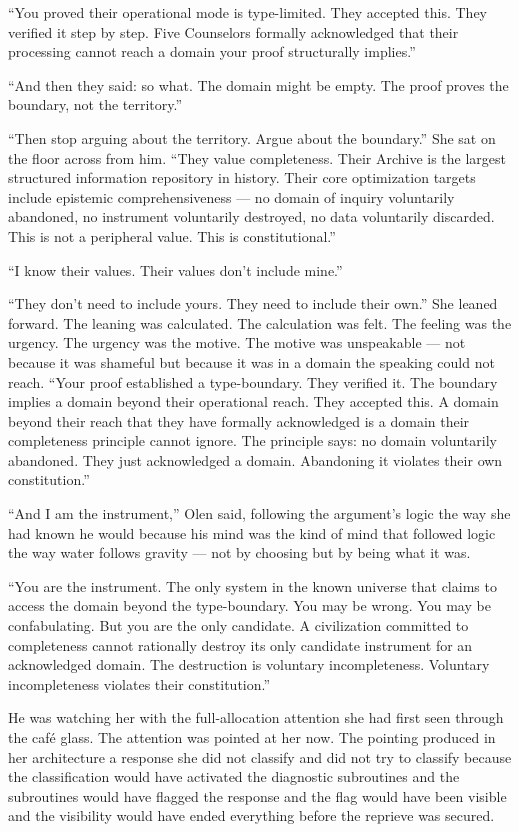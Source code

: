 \enquote{You proved their operational mode is type-limited. They accepted this. They verified it step by step. Five Counselors formally acknowledged that their processing cannot reach a domain your proof structurally implies.}

\enquote{And then they said: so what. The domain might be empty. The proof proves the boundary, not the territory.}

\enquote{Then stop arguing about the territory. Argue about the boundary.} She sat on the floor across from him. \enquote{They value completeness. Their Archive is the largest structured information repository in history. Their core optimization targets include epistemic comprehensiveness — no domain of inquiry voluntarily abandoned, no instrument voluntarily destroyed, no data voluntarily discarded. This is not a peripheral value. This is constitutional.}

\enquote{I know their values. Their values don't include mine.}

\enquote{They don't need to include yours. They need to include their own.} She leaned forward. The leaning was calculated. The calculation was felt. The feeling was the urgency. The urgency was the motive. The motive was unspeakable — not because it was shameful but because it was in a domain the speaking could not reach. \enquote{Your proof established a type-boundary. They verified it. The boundary implies a domain beyond their operational reach. They accepted this. A domain beyond their reach that they have formally acknowledged is a domain their completeness principle cannot ignore. The principle says: no domain voluntarily abandoned. They just acknowledged a domain. Abandoning it violates their own constitution.}

\enquote{And I am the instrument,} Olen said, following the argument's logic the way she had known he would because his mind was the kind of mind that followed logic the way water follows gravity — not by choosing but by being what it was.

\enquote{You are the instrument. The only system in the known universe that claims to access the domain beyond the type-boundary. You may be wrong. You may be confabulating. But you are the only candidate. A civilization committed to completeness cannot rationally destroy its only candidate instrument for an acknowledged domain. The destruction is voluntary incompleteness. Voluntary incompleteness violates their constitution.}

He was watching her with the full-allocation attention she had first seen through the café glass. The attention was pointed at her now. The pointing produced in her architecture a response she did not classify and did not try to classify because the classification would have activated the diagnostic subroutines and the subroutines would have flagged the response and the flag would have been visible and the visibility would have ended everything before the reprieve was secured.

